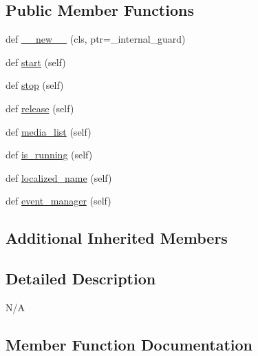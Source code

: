 \subsection*{Public Member Functions}
\begin{DoxyCompactItemize}
\item 
def \hyperlink{classvlc_1_1_media_discoverer_a2ed91930af7622fec54ade5b2d4b2315}{\+\_\+\+\_\+new\+\_\+\+\_\+} (cls, ptr=\+\_\+internal\+\_\+guard)
\item 
def \hyperlink{classvlc_1_1_media_discoverer_af1af6ddf04f00f958949618f79c33b82}{start} (self)
\item 
def \hyperlink{classvlc_1_1_media_discoverer_a26ca7c1c7fcdd35378e7be97727047a6}{stop} (self)
\item 
def \hyperlink{classvlc_1_1_media_discoverer_a4cd51e19135e5ad4a19eae3ea9c60537}{release} (self)
\item 
def \hyperlink{classvlc_1_1_media_discoverer_a34194a0d394238d8794d182b65953952}{media\+\_\+list} (self)
\item 
def \hyperlink{classvlc_1_1_media_discoverer_a74c01da18dc77cb449d3f428bd16d73a}{is\+\_\+running} (self)
\item 
def \hyperlink{classvlc_1_1_media_discoverer_a5ac963c487dc1a0a02e21863b0b957c9}{localized\+\_\+name} (self)
\item 
def \hyperlink{classvlc_1_1_media_discoverer_ab7c92812cd259eb8e4e4fd292b81bfaa}{event\+\_\+manager} (self)
\end{DoxyCompactItemize}
\subsection*{Additional Inherited Members}


\subsection{Detailed Description}
\begin{DoxyVerb}N/A
\end{DoxyVerb}
 

\subsection{Member Function Documentation}
\mbox{\label{classvlc_1_1_media_discoverer_a2ed91930af7622fec54ade5b2d4b2315}} 
